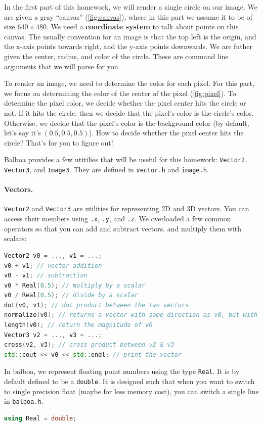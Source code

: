 In the first part of this homework, we will render a single circle on our image. We are given a gray ``canvas'' (\cref{fig:canvas}), where in this part we assume it to be of size $640 \times 480$. We need a \textbf{coordinate system} to talk about points on this canvas. The usually convention for an image is that the top left is the origin, and the x-axis points towards right, and the y-axis points downwards. We are futher given the center, radius, and color of the circle. These are command line arguments that we will parse for you.

To render an image, we need to determine the color for each pixel. For this part, we focus on determining the color of the center of the pixel (\cref{fig:pixel}). To determine the pixel color, we decide whether the pixel center hits the circle or not. If it hits the circle, then we decide that the pixel's color is the circle's color. Otherwise, we decide that the pixel's color is the background color (by default, let's say it's $(0.5, 0.5, 0.5)$). How to decide whether the pixel center hits the circle? That's for you to figure out!

Balboa provides a few utitilies that will be useful for this homework: \lstinline{Vector2}, \lstinline{Vector3}, and \lstinline{Image3}. They are defined in \lstinline{vector.h} and \lstinline{image.h}. 

\paragraph{Vectors.} \lstinline{Vector2} and \lstinline{Vector3} are utilities for representing 2D and 3D vectors. You can access their members using \lstinline{.x}, \lstinline{.y}, and \lstinline{.z}. We overloaded a few common operators so that you can add and subtract vectors, and multiply them with scalars:
\begin{lstlisting}[language=C++]
Vector2 v0 = ..., v1 = ...;
v0 + v1; // vector addition
v0 - v1; // subtraction
v0 * Real(0.5); // multiply by a scalar
v0 / Real(0.5); // divide by a scalar
dot(v0, v1); // dot product between the two vectors
normalize(v0); // returns a vector with same direction as v0, but with magnitude of 1
length(v0); // return the magnitude of v0
Vector3 v2 = ..., v3 = ...;
cross(v2, v3); // cross product between v2 & v3
std::cout << v0 << std::endl; // print the vector
\end{lstlisting}
In balboa, we represent floating point numbers using the type \lstinline{Real}. It is by default defined to be a \lstinline{double}. It is designed such that when you want to switch to single precision float (maybe for less memory cost), you can switch a single line in \lstinline{balboa.h}.
\begin{lstlisting}[language=C++]
using Real = double;
\end{lstlisting}

